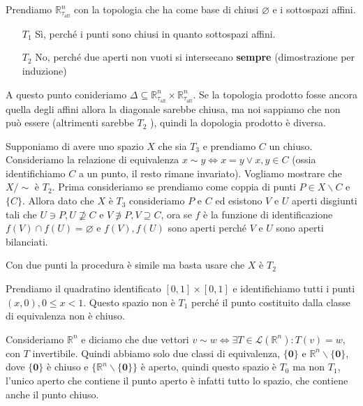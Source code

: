 \begin{example}
    Prendiamo \(\mathbb{R}^{n}_{\tau_\text{aff} }\) con la topologia che ha come base di chiusi
    \(\varnothing\) e i sottospazi affini.
\begin{enumerate}[label = \arabic*.]
    \item[\(T_{1}\) ] Sì, perché i punti sono chiusi in quanto sottospazi
        affini.
    \item[\(T_{2}\) ] No, perché due aperti non vuoti si intersecano
        \textbf{sempre} (dimostrazione per induzione)
\end{enumerate}
A questo punto conideriamo \(\Delta \subseteq \mathbb{R}^{n}_{\tau_\text{aff} }
\times \mathbb{R}^{n}_{\tau_\text{aff}  }\). Se la topologia prodotto fosse
ancora quella degli affini allora la diagonale sarebbe chiusa, ma noi sappiamo
che non può essere (altrimenti sarebbe \(T_{2}\) ), quindi la dopologia prodotto è diversa.
\end{example}

\begin{example}
    Supponiamo di avere uno spazio \(X\) che sia \(T_{3}\) e prendiamo \(C\) un
    chiuso. Consideriamo la relazione di equivalenza \(x \sim y \iff x = y \lor
    x, y \in C\) (ossia identifichiamo \(C\) a un punto, il resto rimane
    invariato).
    Vogliamo mostrare che \(X / \sim \) è \(T_{2}\).
    Prima consideriamo se prendiamo come coppia di punti \(P \in X
    \smallsetminus C\) e \(\{C\} \). Allora dato che \(X\) è \(T_{3}\)
    consideriamo \(P\) e \(C\) ed esistono \(V\) e \(U\) aperti disgiunti tali che \(U \ni P, U
    \not\supseteq C \) e \(V \not\ni P, V \supseteq C\), ora se \(f\) è la
    funzione di identificazione \(f(V) \cap f(U) = \varnothing\) e \(f(V),
    f(U)\) sono aperti perché \(V\) e \(U\) sono aperti bilanciati.

    Con due punti la procedura è simile ma basta usare che \(X\) è \(T_{2}\) 
\end{example}

\begin{example}
    Prendiamo il quadratino identificato \([0, 1] \times [0, 1]\) e
    identifichiamo tutti i punti \((x, 0), 0 \le x < 1\). Questo spazio non è
    \(T_{1}\) perché il punto costituito dalla classe di equivalenza non è
    chiuso.
\end{example}

\begin{example}
    Consideriamo \(\mathbb{R}^{n}\) e diciamo che due vettori \(v \sim w \iff
\exists T \in \mathcal{L}(\mathbb{R}^{n}) : T(v) = w\), con \(T\) invertibile.
    Quindi abbiamo solo due classi di equivalenza, \(\{\mathbf{0}\} \) e
    \(\mathbb{R}^{n} \smallsetminus \{\mathbf{0}\} \), dove \(\{\mathbf{0}\}\) è chiuso
    e \(\{\mathbb{R}^{n} \smallsetminus \{\mathbf{0}\}\} \) è aperto, quindi
    questo spazio è \(T_{0}\) ma non \(T_{1}\), l'unico aperto che contiene il
    punto aperto è infatti tutto lo spazio, che contiene anche il punto chiuso.
\end{example}

